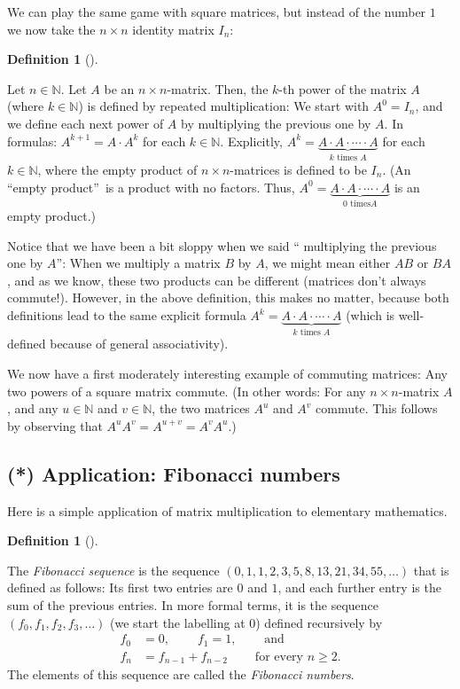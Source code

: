 \documentclass[numbers=enddot,12pt,final,onecolumn,notitlepage]{scrartcl}%
\theoremstyle{definition}
\newtheorem{defi}[theo]{Definition}
\newenvironment{definition}[1][]
{\begin{defi}[#1]\begin{leftbar}}
{\end{leftbar}\end{defi}}
\begin{document}
We can play the same game with square matrices, but instead of the number $1$
we now take the $n\times n$ identity matrix $I_{n}$:

\begin{definition}
Let $n\in\mathbb{N}$. Let $A$ be an $n\times n$-matrix. Then, the $k$-th power
of the matrix $A$ (where $k\in\mathbb{N}$) is defined by repeated
multiplication: We start with $A^{0}=I_{n}$, and we define each next power of
$A$ by multiplying the previous one by $A$. In formulas: $A^{k+1}=A\cdot
A^{k}$ for each $k\in\mathbb{N}$. Explicitly, $A^{k}=\underbrace{A\cdot
A\cdot\cdots\cdot A}_{k\text{ times }A}$ for each $k\in\mathbb{N}$, where the
empty product of $n\times n$-matrices is defined to be $I_{n}$. (An
\textquotedblleft empty product\textquotedblright\ is a product with no
factors. Thus, $A^{0}=\underbrace{A\cdot A\cdot\cdots\cdot A}_{0\text{ times
}A}$ is an empty product.)
\end{definition}

Notice that we have been a bit sloppy when we said \textquotedblleft
multiplying the previous one by $A$\textquotedblright: When we multiply a
matrix $B$ by $A$, we might mean either $AB$ or $BA$, and as we know, these
two products can be different (matrices don't always commute!). However, in
the above definition, this makes no matter, because both definitions lead to
the same explicit formula $A^{k}=\underbrace{A\cdot A\cdot\cdots\cdot
A}_{k\text{ times }A}$ (which is well-defined because of general associativity).

We now have a first moderately interesting example of commuting matrices: Any
two powers of a square matrix commute. (In other words: For any $n\times
n$-matrix $A$, and any $u\in\mathbb{N}$ and $v\in\mathbb{N}$, the two matrices
$A^{u}$ and $A^{v}$ commute. This follows by observing that $A^{u}%
A^{v}=A^{u+v}=A^{v}A^{u}$.)

\subsection{(*) Application: Fibonacci numbers}

Here is a simple application of matrix multiplication to elementary mathematics.

\begin{definition}
\label{def.fibonacci}The \textit{Fibonacci sequence} is the sequence $\left(
0,1,1,2,3,5,8,13,21,34,55,\ldots\right)  $ that is defined as follows: Its
first two entries are $0$ and $1$, and each further entry is the sum of the
previous entries. In more formal terms, it is the sequence $\left(
f_{0},f_{1},f_{2},f_{3},\ldots\right)  $ (we start the labelling at $0$)
defined recursively by%
\begin{align*}
f_{0}  &  =0,\ \ \ \ \ \ \ \ \ \ f_{1}=1,\ \ \ \ \ \ \ \ \ \ \text{and}\\
f_{n}  &  =f_{n-1}+f_{n-2}\ \ \ \ \ \ \ \ \ \ \text{for every }n\geq2.
\end{align*}
The elements of this sequence are called the \textit{Fibonacci numbers}.
\end{definition}
\end{document}
